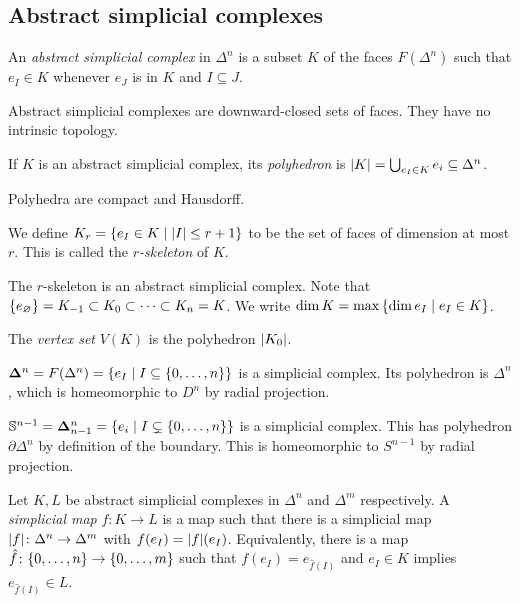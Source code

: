 \subsection{Abstract simplicial complexes}
\begin{definition}
	An \emph{abstract simplicial complex} in \( \Delta^n \) is a subset \( K \) of the faces \( F(\Delta^n) \) such that \( e_I \in K \) whenever \( e_J \) is in \( K \) and \( I \subseteq J \).
\end{definition}
\begin{remark}
	Abstract simplicial complexes are downward-closed sets of faces.
	They have no intrinsic topology.
\end{remark}
\begin{definition}
	If \( K \) is an abstract simplicial complex, its \emph{polyhedron} is \( \abs{K} = \bigcup_{e_I \in K} e_i \subseteq \Delta^n \).
\end{definition}
\begin{remark}
	Polyhedra are compact and Hausdorff.
\end{remark}
\begin{definition}
	We define \( K_r = \qty{e_I \in K \mid \abs{I} \leq r + 1} \) to be the set of faces of dimension at most \( r \).
	This is called the \emph{\( r \)-skeleton} of \( K \).
\end{definition}
The \( r \)-skeleton is an abstract simplicial complex.
Note that \( \qty{e_\varnothing} = K_{-1} \subset K_0 \subset \dots \subset K_n = K \).
We write \( \dim K = \max\qty{\dim e_I \mid e_I \in K} \).
\begin{definition}
	The \emph{vertex set} \( V(K) \) is the polyhedron \( \abs{K_0} \).
\end{definition}
\begin{example}
	\( \bm \Delta^n = F(\Delta^n) = \qty{e_I \mid I \subseteq \qty{0, \dots, n}} \) is a simplicial complex.
	Its polyhedron is \( \Delta^n \), which is homeomorphic to \( D^n \) by radial projection.
\end{example}
\begin{example}
	\( \mathbb S^{n-1} = \bm \Delta_{n-1}^n = \qty{e_i \mid I \subsetneq \qty{0, \dots, n}} \) is a simplicial complex.
	This has polyhedron \( \partial \Delta^n \) by definition of the boundary.
	This is homeomorphic to \( S^{n-1} \) by radial projection.
\end{example}
\begin{definition}
	Let \( K, L \) be abstract simplicial complexes in \( \Delta^n \) and \( \Delta^m \) respectively.
	A \emph{simplicial map} \( f \colon K \to L \) is a map such that there is a simplicial map \( \abs{f} \colon \Delta^n \to \Delta^m \) with \( f(e_I) = \abs{f}(e_I) \).
	Equivalently, there is a map \( \hat f \colon \qty{0, \dots, n} \to \qty{0, \dots, m} \) such that \( f(e_I) = e_{\hat f(I)} \) and \( e_I \in K \) implies \( e_{\hat f(I)} \in L \).
\end{definition}
